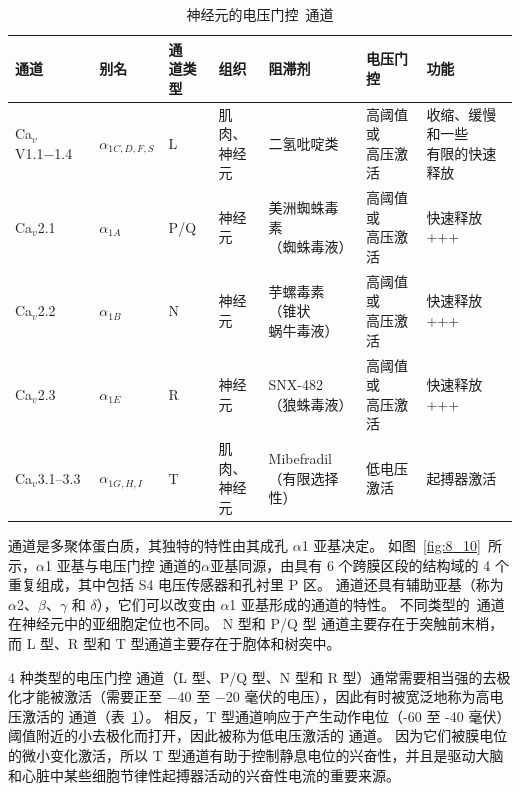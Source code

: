 \begin{table}[htbp]
	\caption{神经元的电压门控~通道} \label{tab:15_1} \centering
	\begin{tabular}{lllllll}
		\toprule
		通道 & 别名 & \makecell[l]{\ce{Ca^2+}通\\道类型}  & 组织 & 阻滞剂 & 电压门控 & 功能\\
		\midrule
		Ca$_v$V1.1−1.4 & $\alpha_{1C,D,F,S}$ & L & \makecell[l]{肌肉、\\神经元} & 二氢吡啶类 & \makecell[l]{高阈值或\\高压激活} & \makecell[l]{收缩、缓慢和一些\\有限的快速释放} \\
		Ca$_v$2.1 & $\alpha_{1A}$ & P/Q & 神经元 & \makecell[l]{美洲蜘蛛毒素\\（蜘蛛毒液）} & \makecell[l]{高阈值或\\高压激活} & 快速释放 +++ \\
		Ca$_v$2.2 & $\alpha_{1B}$ & N & 神经元 & \makecell[l]{芋螺毒素（锥状\\蜗牛毒液）} & \makecell{高阈值或\\高压激活} & 快速释放+++ \\
		Ca$_v$2.3 & $\alpha_{1E}$ & R & 神经元 & \makecell[l]{SNX-482\\（狼蛛毒液）} & \makecell[l]{高阈值或\\高压激活} & 快速释放 +++ \\
		Ca$_v$3.1–3.3 & $\alpha_{1G,H,I}$ & T & \makecell[l]{肌肉、\\神经元} & \makecell[l]{Mibefradil\\（有限选择性）} & 低电压激活 & 起搏器激活 \\
		\bottomrule
	\end{tabular}
\end{table}


通道是多聚体蛋白质，其独特的特性由其成孔 $\alpha$1 亚基决定。
如图~\ref{fig:8_10}~所示，$\alpha$1 亚基与电压门控  通道的$\alpha$亚基同源，由具有 6 个跨膜区段的结构域的 4 个重复组成，其中包括 S4 电压传感器和孔衬里 P 区。
通道还具有辅助亚基（称为 $\alpha$2、$\beta$、$\gamma$ 和 $\delta$），它们可以改变由 $\alpha$1 亚基形成的通道的特性。
不同类型的~通道在神经元中的亚细胞定位也不同。
N 型和 P/Q 型  通道主要存在于突触前末梢，而 L 型、R 型和 T 型通道主要存在于胞体和树突中。


4 种类型的电压门控  通道（L 型、P/Q 型、N 型和 R 型）通常需要相当强的去极化才能被激活（需要正至 −40 至 −20 毫伏的电压），因此有时被宽泛地称为高电压激活的  通道（表~\ref{tab:15_1}）。
相反，T 型通道响应于产生动作电位（-60 至 -40 毫伏）阈值附近的小去极化而打开，因此被称为低电压激活的  通道。
因为它们被膜电位的微小变化激活，所以 T 型通道有助于控制静息电位的兴奋性，并且是驱动大脑和心脏中某些细胞节律性起搏器活动的兴奋性电流的重要来源。


